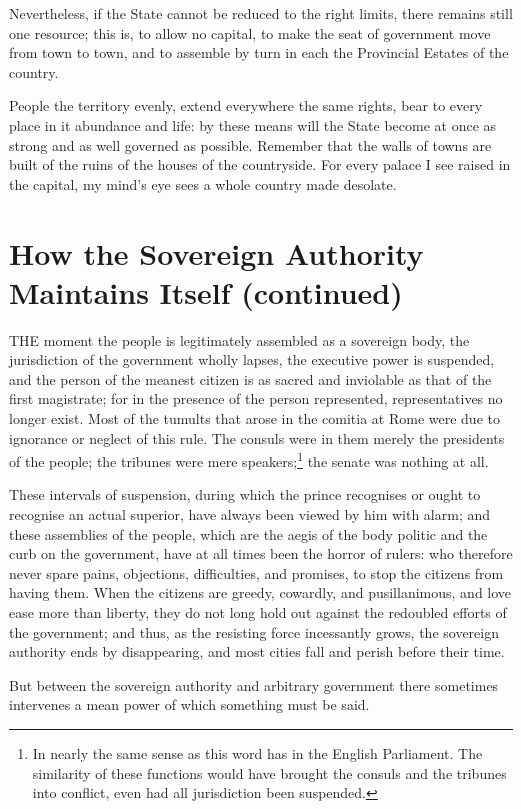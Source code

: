 \documentclass[12pt]{book}
\begin{document}
Nevertheless, if the State cannot be reduced to the right limits, there remains still one resource; this is, to allow no capital, to make the seat of government move from town to town, and to assemble by turn in each the Provincial Estates of the country.

People the territory evenly, extend everywhere the same rights, bear to every place in it abundance and life: by these means will the State become at once as strong and as well governed as possible. Remember that the walls of towns are built of the ruins of the houses of the countryside. For every palace I see raised in the capital, my mind's eye sees a whole country made desolate.

\section{How the Sovereign Authority Maintains Itself (continued)}

THE moment the people is legitimately assembled as a sovereign body, the jurisdiction of the government wholly lapses, the executive power is suspended, and the person of the meanest citizen is as sacred and inviolable as that of the first magistrate; for in the presence of the person represented, representatives no longer exist. Most of the tumults that arose in the comitia at Rome were due to ignorance or neglect of this rule. The consuls were in them merely the presidents of the people; the tribunes were mere speakers;\footnote{In nearly the same sense as this word has in the English Parliament. The similarity of these functions would have brought the consuls and the tribunes into conflict, even had all jurisdiction been suspended.} the senate was nothing at all.

These intervals of suspension, during which the prince recognises or ought to recognise an actual superior, have always been viewed by him with alarm; and these assemblies of the people, which are the aegis of the body politic and the curb on the government, have at all times been the horror of rulers: who therefore never spare pains, objections, difficulties, and promises, to stop the citizens from having them. When the citizens are greedy, cowardly, and pusillanimous, and love ease more than liberty, they do not long hold out against the redoubled efforts of the government; and thus, as the resisting force incessantly grows, the sovereign authority ends by disappearing, and most cities fall and perish before their time.

But between the sovereign authority and arbitrary government there sometimes intervenes a mean power of which something must be said.
\end{document}

